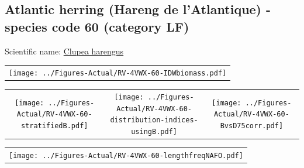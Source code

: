 \documentclass[12pt]{article}\usepackage[]{graphicx}\usepackage[]{color}
\begin{document}
\renewcommand\thefigure{\thesubsection\Alph{figure}}

\setcounter{figure}{0}

\hypertarget{sec:60}{%
\subsection{Atlantic herring (Hareng de l'Atlantique) - species code 60 (category LF)}\label{sec:60}}

  


Scientific name: \href{http://www.marinespecies.org/aphia.php?p=taxdetails\&id=126417}{Clupea harengus} \newline
\begin{minipage}{1.0\textwidth}
 \begin{tabular}{c}
\texttt{[image: ../Figures-Actual/RV-4VWX-60-IDWbiomass.pdf]} \\ 
\end{tabular} 
\end{minipage}
\newline

\vspace{1cm}
\begin{minipage}{1.0\textwidth}
 \begin{tabular}{ccc}
\texttt{[image: ../Figures-Actual/RV-4VWX-60-stratifiedB.pdf]} & 
\texttt{[image: ../Figures-Actual/RV-4VWX-60-distribution-indices-usingB.pdf]} & 
\texttt{[image: ../Figures-Actual/RV-4VWX-60-BvsD75corr.pdf]} \\ 
\end{tabular} 
\end{minipage}
\clearpage
\begin{minipage}{1.0\textwidth}
 \begin{tabular}{c}
\texttt{[image: ../Figures-Actual/RV-4VWX-60-lengthfreqNAFO.pdf]} \\ 
\end{tabular} 
\end{minipage}
\newline
\end{document}
